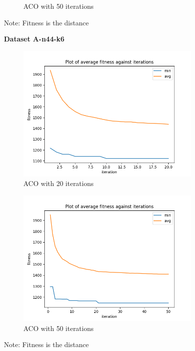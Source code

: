 \documentclass[a4paper]{exam}
\begin{document}
\begin{questions}
\begin{figure}[H]
\begin{subfigure}{.5\textwidth}
      \caption{ACO with 50 iterations}
      \label{fig:n32-k5_50}
    \end{subfigure}
    \caption{Note: Fitness is the distance}
    \label{fig:n32-k5}
  \end{figure}

  \begin{figure}[H]
    \centering
    \textbf{Dataset A-n44-k6}
    \begin{subfigure}{.5\textwidth}
      \centering
      \includegraphics[width=1\linewidth]{images/n44-k6_20.png}
      \caption{ACO with 20 iterations}
      \label{fig:n44-k6_20}
    \end{subfigure}%
    \begin{subfigure}{.5\textwidth}
      \centering
      \includegraphics[width=1\linewidth]{images/n44-k6_50.png}
      \caption{ACO with 50 iterations}
      \label{fig:n44-k6_50}
    \end{subfigure}
    \caption{Note: Fitness is the distance}
    \label{fig:n44-k6}
  \end{figure}


\end{questions}
\end{document}
